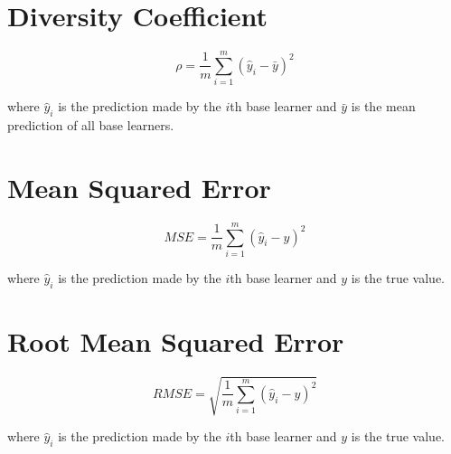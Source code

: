 \documentclass{article}
\begin{document}
\section{Diversity Coefficient}
\label{appendix:diversity_coefficient}
\[
\rho = \frac{1}{m} \sum_{i=1}^{m} (\hat{y}_i - \bar{y})^{2}
\]
\begin{center}
    \begin{minipage}{0.8\linewidth}
        \small
        where $\hat{y}_i$ is the prediction made by the $i$th base learner and  
        $\bar{y}$ is the mean prediction of all base learners. 
    \end{minipage}
\end{center}


\section{Mean Squared Error}
\label{appendix:mse}
\[
MSE = \frac{1}{m} \sum_{i=1}^{m} (\hat{y}_i - y)^{2}
\]
\begin{center}
    \begin{minipage}{0.8\linewidth}
        \small
        where $\hat{y}_i$ is the prediction made by the $i$th base learner and  
        $y$ is the true value. 
    \end{minipage}
\end{center}


\section{Root Mean Squared Error}
\label{appendix:rmse}
\[
RMSE = \sqrt{\frac{1}{m} \sum_{i=1}^{m} (\hat{y}_i - y)^{2}}
\]
\begin{center}
    \begin{minipage}{0.8\linewidth}
        \small
        where $\hat{y}_i$ is the prediction made by the $i$th base learner and  
        $y$ is the true value. 
    \end{minipage}
\end{center}
\end{document}
